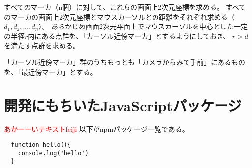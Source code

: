 すべてのマーカ（n個）に対して、これらの画面上2次元座標を求める。
すべてのマーカの画面上2次元座標とマウスカーソルとの距離をそれぞれ求める（$d_1, d_2, ..., d_n$）。
あらかじめ画面2次元平面上でマウスカーソルを中心とした一定の半径$r$内にある点群を、「カーソル近傍マーカ」とするようにしておき、
$r > d$を満たす点群を求める。

「カーソル近傍マーカ」群のうちもっとも「カメラからみて手前」にあるものを、「最近傍マーカ」とする。



\section{開発にもちいたJavaScriptパッケージ}
\textcolor{red}{あかーーいテキストfeiji}
以下がnpmパッケージ一覧である。

\begin{lstlisting}
  function hello(){
    console.log('hello')
  }
\end{lstlisting}



